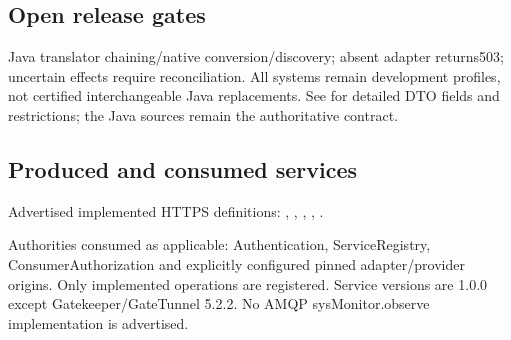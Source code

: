 \documentclass[a4paper]{arrowhead}
\begin{document}
\subsection{Open release gates}
Java translator chaining/native conversion/discovery; absent adapter returns503; uncertain effects require reconciliation. All systems remain development profiles, not certified interchangeable Java replacements. See  for detailed DTO fields and restrictions; the Java sources remain the authoritative contract.
\subsection{Produced and consumed services}
Advertised implemented HTTPS definitions: , \allowbreak {}, \allowbreak {}, \allowbreak {}, \allowbreak {}.\par
Authorities consumed as applicable: Authentication, ServiceRegistry, ConsumerAuthorization and explicitly configured pinned adapter/provider origins. Only implemented operations are registered. Service versions are 1.0.0 except Gatekeeper/GateTunnel 5.2.2. No AMQP sysMonitor.observe implementation is advertised.
\end{document}

